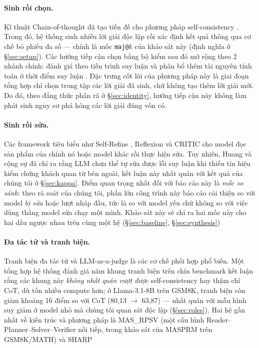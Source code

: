\documentclass[11pt,a4paper]{article}
\begin{document}
\paragraph{Sinh rồi chọn.} Kĩ thuật Chain-of-thought \cite{wei2022} đã tạo tiền đề cho phương pháp self-consistency
\cite{wang2023}. Trong đó, hệ thống sinh nhiều lời giải độc lập rồi xác định kết quả thông qua cơ chế bỏ phiếu đa số --- chính là mốc
\texttt{maj@}$k$ của khảo sát này (định nghĩa ở \S\ref{sec:setup}). Các hướng tiếp cận chọn bằng bộ kiểm sau đó mở rộng theo 2 nhánh chính: đánh giá theo tiến trình suy luận \cite{lightman2024} và phân bổ thêm tài nguyên tính toán ở thời điểm suy luận \cite{snell2024}. Đặc trưng cốt lõi của phương pháp này là giai đoạn tổng hợp chỉ chọn trong tập các lời giải đã sinh, chứ không tạo thêm lời
giải mới. Do đó, theo đẳng thức phân rã ở \S\ref{sec:identity}, hướng tiếp cận này không làm phát sinh nguy cơ phá hỏng các lời giải đúng vốn có.

\paragraph{Sinh rồi sửa.} Các framework tiêu biểu như Self-Refine \cite{madaan2023}, Reflexion \cite{shinn2023} và CRITIC
\cite{gou2024} cho model đọc sản phẩm của chính nó hoặc model khác rồi thực hiện sửa. Tuy nhiên, Huang và cộng sự
\cite{huang2024} đã chỉ ra rằng LLM chưa thể tự sửa được lỗi suy luận khi thiếu tín hiệu kiểm chứng khách quan từ bên ngoài, kết luận này nhất quán với
kết quả của chúng tôi ở \S\ref{sec:kappa}. Điểm quan trọng nhất đối với báo cáo này là \emph{mốc
so sánh}: theo rà soát của chúng tôi, phần lớn công trình này báo cáo cải thiện so với model
\emph{bị sửa} hoặc lượt nháp đầu, tức là so với model yếu chứ không so với việc dùng
thẳng model sửa chạy một mình. Khảo sát này sẽ chỉ ra hai mốc này cho hai dấu ngược nhau trên cùng một hệ (\S\ref{sec:baseline},
\S\ref{sec:synthesis})

\paragraph{Đa tác tử và tranh biện.} Tranh biện đa tác tử \cite{du2024} và LLM-as-a-judge
\cite{zheng2023} là các cơ chế phối hợp phổ biến. Một tổng hợp hệ thống \cite{mad2025baseline}
đánh giá năm khung tranh biện trên chín benchmark kết luận rằng các khung này \emph{không nhất
quán vượt được} self-consistency hay thậm chí CoT, dù tốn nhiều compute hơn; ở Llama-3.1-8B trên
GSM8K, tranh biện còn giảm khoảng 16 điểm so với CoT (80,13 $\to$ 63,87) --- nhất quán với mẫu
hình suy giảm ở model nhỏ mà chúng tôi quan sát độc lập (\S\ref{sec:roles}). Hai hệ gần nhất về
kiến trúc và phương pháp là MAS\_RPSV (một cấu hình Reader--Planner--Solver--Verifier nối tiếp,
trong khảo sát của MASPRM \cite{masprm2025} trên GSM8K/MATH) và SHARP \cite{sharp2025}
\end{document}
